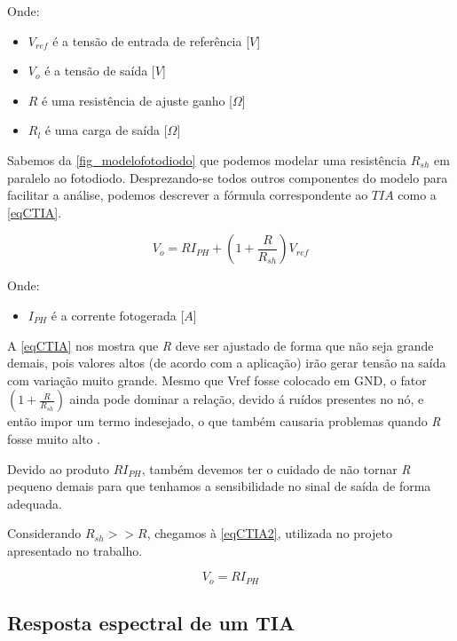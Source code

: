 Onde:

\begin{itemize}
    \item $V_{ref}$ \'e a tensão de entrada de referência [$V$]
    \item $V_o$ \'e a tensão de sa\'ida [$V$]
    \item $R$ \'e uma resist\^encia de ajuste ganho [$\Omega$]
    \item $R_l$ \'e uma carga de sa\'ida [$\Omega$]
\end{itemize}

Sabemos da \autoref{fig_modelofotodiodo} que podemos modelar uma resist\^encia $R_{sh}$ em paralelo ao fotodiodo. Desprezando-se todos outros componentes do modelo para facilitar a an\'alise, podemos descrever a f\'ormula correspondente ao $TIA$ como a \autoref{eqCTIA}.

\begin{equation}
    \label{eqCTIA}
    V_o = RI_{PH} + (1+\frac{R}{R_{sh}})V_{ref}
\end{equation}

Onde:
\begin{itemize}
    \item $I_{PH}$ \'e a corrente fotogerada [$A$]
\end{itemize}

A \autoref{eqCTIA} nos mostra que \textit{R} deve ser ajustado de forma que não seja grande demais, pois valores altos (de acordo com a aplicação) irão gerar tensão na sa\'ida com variação muito grande. Mesmo que Vref fosse colocado em GND, o fator $(1+\frac{R}{R_{sh}})$ ainda pode dominar a relação, devido \'a ruídos presentes no nó, e então impor um termo indesejado, o que também causaria problemas quando \textit{R} fosse muito alto \cite{hamamatsu}.

Devido ao produto $RI_{PH}$, também devemos ter o cuidado de não tornar \textit{R} pequeno demais para que tenhamos a sensibilidade no sinal de saída de forma adequada.

Considerando $R_{sh} >> R$, chegamos à \autoref{eqCTIA2}, utilizada no projeto apresentado no trabalho.

\begin{equation}
    \label{eqCTIA2}
    V_o = RI_{PH}
\end{equation}

\subsection{Resposta espectral de um TIA}

